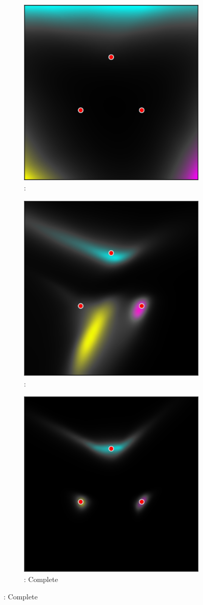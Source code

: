 \begin{figure}
    \centering
    \begin{subfigure}[t]{0.33 \textwidth}
        \centering
        \includegraphics[width=0.5 \textwidth]{sections/006_neurips2020/figures/three_gaussians_no_flow-crop.pdf}
        \caption{\oursacro: \NoFlow}
    \end{subfigure}%
    \begin{subfigure}[t]{0.33 \textwidth}
        \centering
        \includegraphics[width=0.5 \textwidth]{sections/006_neurips2020/figures/three_gaussians_no_UCE-crop.pdf}
        \caption{\oursacro: \NoUCE}
    \end{subfigure}%
    \begin{subfigure}[t]{0.33 \textwidth}
        \centering
        \includegraphics[width=0.5 \textwidth]{sections/006_neurips2020/figures/three_gaussians_normal-crop.pdf}
        \caption{\oursacro: Complete}
    \end{subfigure}%


\end{figure}
